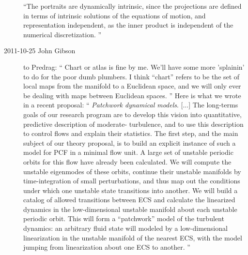 \begin{description}
``The {\stateDsp} portraits are {dynamically intrinsic}, since the
projections are defined in terms of intrinsic solutions of the equations
of motion, and {representation independent}, as the inner product
 is independent of the numerical discretization.
''



\item[2011-10-25 John Gibson~~]  to Predrag: ``         \toCB
Chart or atlas is fine by me. We'll have some more 'splainin' to do for
the poor dumb plumbers. I think ``chart'' refers to be the set of
local maps from the manifold to a Euclidean space, and we will only ever
be dealing with maps between Euclidean spaces.
'' Here is what we wrote in a recent proposal: ``
{\em Patchwork dynamical models}. [...]
The long-terms goals of our research program are to develop this vision into
quantitative, predictive description of moderate-{\Reynolds} turbulence, and
to use this description to control flows and explain their statistics. The
first step, and the main subject of our theory proposal, is to build an explicit
instance of such a model for PCF in a minimal flow unit. A large set of
unstable periodic orbits for this flow have already been calculated.
We will compute the unstable eigenmodes of these orbits, continue their
unstable manifolds by time-integration of small perturbations, and thus map
out the conditions under which one unstable state transitions into another.
We will build a catalog of allowed transitions between ECS and calculate
the linearized dynamics in the low-dimensional unstable manifold about each
unstable periodic orbit. This will form a ``patchwork'' model of the turbulent
dynamics: an arbitrary fluid state will modeled by a low-dimensional
linearization in the unstable manifold of the nearest ECS, with the model
jumping from linearization about one ECS to another.
''



\end{description}
